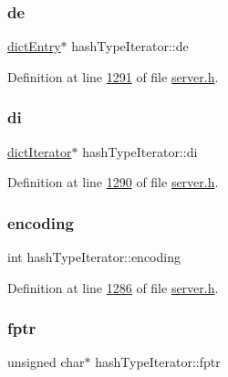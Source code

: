 \subsubsection{\texorpdfstring{de}{de}}
{\footnotesize\ttfamily \hyperlink{structdictEntry}{dict\+Entry}$\ast$ hash\+Type\+Iterator\+::de}



Definition at line \hyperlink{server_8h_source_l01291}{1291} of file \hyperlink{server_8h_source}{server.\+h}.

\mbox{\label{structhashTypeIterator_a1159f51a564f49bf545b47b2f53a5934}} 
\subsubsection{\texorpdfstring{di}{di}}
{\footnotesize\ttfamily \hyperlink{structdictIterator}{dict\+Iterator}$\ast$ hash\+Type\+Iterator\+::di}



Definition at line \hyperlink{server_8h_source_l01290}{1290} of file \hyperlink{server_8h_source}{server.\+h}.

\mbox{\label{structhashTypeIterator_a4511142a32f206a5800c01836a849a69}} 
\subsubsection{\texorpdfstring{encoding}{encoding}}
{\footnotesize\ttfamily int hash\+Type\+Iterator\+::encoding}



Definition at line \hyperlink{server_8h_source_l01286}{1286} of file \hyperlink{server_8h_source}{server.\+h}.

\mbox{\label{structhashTypeIterator_ae244f0db1d25dcb36626cc0166604b29}} 
\subsubsection{\texorpdfstring{fptr}{fptr}}
{\footnotesize\ttfamily unsigned char$\ast$ hash\+Type\+Iterator\+::fptr}



